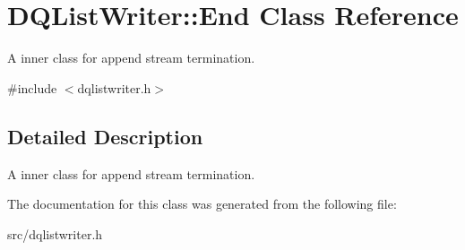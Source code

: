 \hypertarget{classDQListWriter_1_1End}{
\section{DQListWriter::End Class Reference}
\label{classDQListWriter_1_1End}
}


A inner class for append stream termination.  




{\ttfamily \#include $<$dqlistwriter.h$>$}



\subsection{Detailed Description}
A inner class for append stream termination. 

The documentation for this class was generated from the following file:\begin{DoxyCompactItemize}
\item 
src/dqlistwriter.h\end{DoxyCompactItemize}

